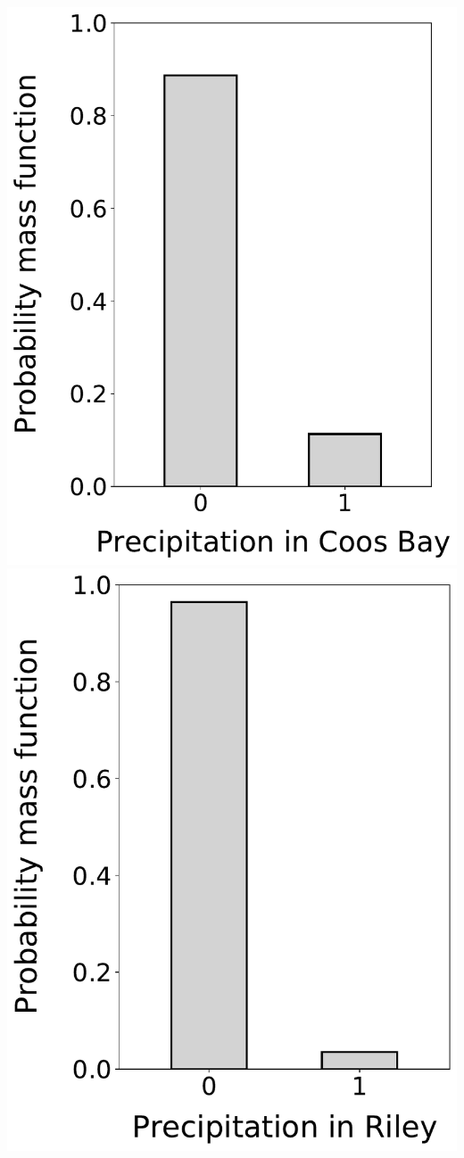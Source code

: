 \documentclass[12pt,twoside]{article}
\begin{document}
\begin{enumerate}
\includegraphics[scale=.5]{precipitation_marginal_pmf_2.pdf}
\includegraphics[scale=.5]{precipitation_marginal_pmf_3.pdf}


\end{enumerate}
\end{document}
